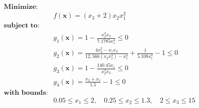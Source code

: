 \begin{align*}
\textbf{Minimize:} & \\
& f(\bm{x}) = (x_3 + 2)x_2x_1^2 \\[0.5em]
\textbf{subject to:} &\\
& g_1(\bm{x}) = 1 - \frac{x_2^3 x_3}{7.1785 x_1^4} \leq 0 \\
& g_2(\bm{x}) = \frac{4x_2^2 - x_1 x_2}{12,566 (x_2 x_1^3) - x_1^4} + \frac{1}{5.108 x_1^2} - 1 \leq 0 \\
& g_3(\bm{x}) = 1 - \frac{140.45 x_1}{x_2^2 x_3} \leq 0 \\
& g_4(\bm{x}) = \frac{x_2 + x_1}{1.5} - 1 \leq 0 \\[0.5em]
\textbf{with bounds:} & \\
& 0.05 \leq x_1 \leq 2, \quad 0.25 \leq x_2 \leq 1.3, \quad 2 \leq x_3 \leq 15
\end{align*}